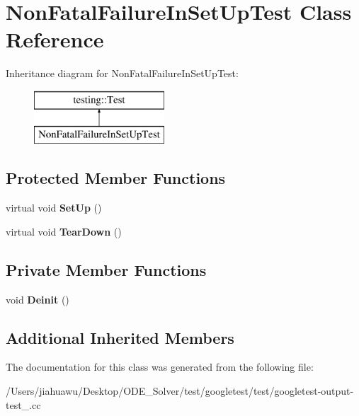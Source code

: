 \hypertarget{class_non_fatal_failure_in_set_up_test}{}\section{Non\+Fatal\+Failure\+In\+Set\+Up\+Test Class Reference}
\label{class_non_fatal_failure_in_set_up_test}
Inheritance diagram for Non\+Fatal\+Failure\+In\+Set\+Up\+Test\+:\begin{figure}[H]
\begin{center}
\leavevmode
\includegraphics[height=2.000000cm]{class_non_fatal_failure_in_set_up_test}
\end{center}
\end{figure}
\subsection*{Protected Member Functions}
\begin{DoxyCompactItemize}
\item 
\mbox{\label{class_non_fatal_failure_in_set_up_test_ae24c724bae1fcd2601f58fa9c26adca3}} 
virtual void {\bfseries Set\+Up} ()
\item 
\mbox{\label{class_non_fatal_failure_in_set_up_test_a36abc808b11afc6a9bfa20dac5c28c30}} 
virtual void {\bfseries Tear\+Down} ()
\end{DoxyCompactItemize}
\subsection*{Private Member Functions}
\begin{DoxyCompactItemize}
\item 
\mbox{\label{class_non_fatal_failure_in_set_up_test_a86ecc924c67807b75e5ef5e89d8277ce}} 
void {\bfseries Deinit} ()
\end{DoxyCompactItemize}
\subsection*{Additional Inherited Members}


The documentation for this class was generated from the following file\+:\begin{DoxyCompactItemize}
\item 
/\+Users/jiahuawu/\+Desktop/\+O\+D\+E\+\_\+\+Solver/test/googletest/test/googletest-\/output-\/test\+\_\+.\+cc\end{DoxyCompactItemize}
